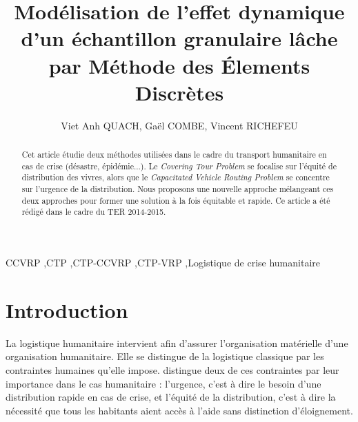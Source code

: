 \documentclass[5p,authoryear,square]{elsarticle}
\begin{document}
\begin{frontmatter}

\title{\textbf{Modélisation de l'effet dynamique d'un échantillon granulaire lâche par Méthode des Élements Discrètes}}

\author{Viet Anh QUACH, Gaël COMBE, Vincent RICHEFEU}
\address{Laboratoire 3SR, Université Grenoble Alpes}


\begin{abstract}
%
%
Cet article  étudie deux méthodes utilisées dans le cadre du transport humanitaire en cas de crise (désastre, épidémie...). Le \emph{Covering Tour Problem} se focalise sur l'équité de distribution des vivres, alors que le \emph{Capacitated Vehicle Routing Problem} se concentre sur l'urgence de la distribution. Nous proposons une nouvelle approche mélangeant ces deux approches pour former une solution à la fois équitable et rapide.
Ce article a été rédigé dans le cadre du TER\footnotemark{} 2014-2015.

\end{abstract}

\begin{keyword}
CCVRP \sep CTP \sep CTP-CCVRP \sep CTP-VRP \sep Logistique de crise humanitaire\end{keyword}

\end{frontmatter}



\section{Introduction}\label{introduction}
La logistique humanitaire intervient afin d'assurer l'organisation matérielle d'une organisation humanitaire. Elle se distingue de la logistique classique par les contraintes humaines qu'elle impose. \citep{campbell_routing_2008} distingue deux de ces contraintes par leur importance dans le cas humanitaire : l'urgence, c'est à dire le besoin d'une distribution rapide en cas de crise, et l'équité de la distribution, c'est à dire la nécessité que tous les habitants aient accès à l'aide sans distinction d'éloignement.
\end{document}
